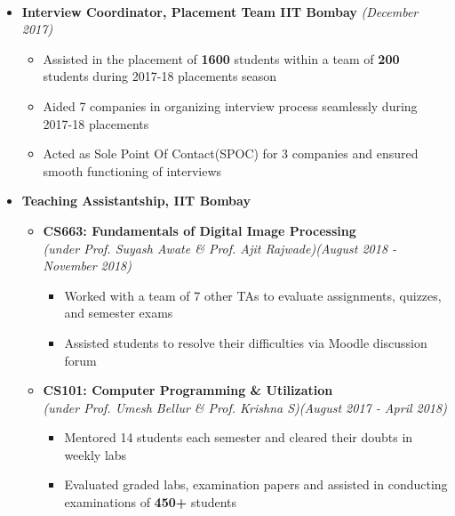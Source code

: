 \documentclass[a4paper,10pt]{article}
\begin{document}
\\[-0.4cm]
\begin{itemize}
  \item \textbf{Interview Coordinator,
  Placement Team IIT Bombay} \emph{\hfill(December 2017)} \\[-0.6cm]
  \begin{itemize}
    \item Assisted in the placement of \textbf{1600} students within a team of \textbf{200} students during 2017-18 placements season
    \item Aided 7 companies in organizing interview process seamlessly during 2017-18 placements
    \item Acted as Sole Point Of Contact(SPOC) for 3 companies and ensured smooth functioning of interviews\\[-0.5cm]
  \end{itemize}
  \item \textbf{Teaching Assistantship, IIT Bombay} \\[-0.6cm]
    \begin{itemize}
         \item \textbf{CS663: Fundamentals of Digital Image Processing} \\ \emph{(under Prof. Suyash Awate \& Prof. Ajit Rajwade)}\hfill \emph{(August 2018 - November 2018)}
        \begin{itemize}
                \item Worked with a team of 7 other TAs to evaluate assignments, quizzes, and semester exams   
                \item Assisted students to resolve their difficulties via Moodle discussion forum
        \end{itemize} 
       \item \textbf{CS101: Computer Programming \& Utilization}\\ \emph{(under Prof. Umesh Bellur \& Prof. Krishna S)}\hfill \emph{(August 2017 - April 2018)}
       \begin{itemize}
           \item Mentored 14 students each semester and cleared their doubts in weekly labs
           \item Evaluated graded labs, examination papers and assisted in conducting examinations of \textbf{450+} students 
       \end{itemize} 
    \end{itemize}
\end{itemize}
\vspace{-0.1cm}
\end{document}
